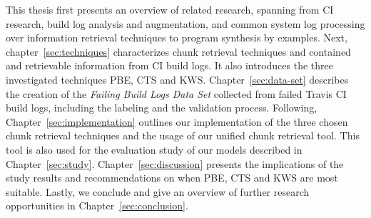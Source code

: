\documentclass[\myrootdir/main.tex]{subfiles}
\begin{document}
This thesis first presents an overview of related research, spanning from CI research, build log analysis and augmentation, and common system log processing over information retrieval techniques to program synthesis by examples.
Next, chapter~\ref{sec:techniques} characterizes chunk retrieval techniques and contained and retrievable information from CI build logs.
It also introduces the three investigated techniques PBE, CTS and KWS\@.
Chapter~\ref{sec:data-set} describes the creation of the \emph{Failing Build Logs Data Set} collected from failed Travis CI build logs, including the labeling and the validation process.
Following, Chapter~\ref{sec:implementation} outlines our implementation of the three chosen chunk retrieval techniques and the usage of our unified chunk retrieval tool.
This tool is also used for the evaluation study of our models described in Chapter~\ref{sec:study}.
Chapter~\ref{sec:discussion} presents the implications of the study results and recommendations on when PBE, CTS and KWS are most suitable.
Lastly, we conclude and give an overview of further research opportunities in Chapter~\ref{sec:conclusion}.
\end{document}
